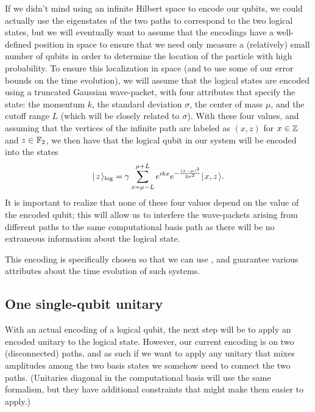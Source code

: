 \documentclass[../thesis-main/thesis-main]{subfiles}
\begin{document}
If we didn't mind using an infinite Hilbert space to encode our qubits, we could actually use the eigenstates of the two paths to correspond to the two logical states, but we will eventually want to assume that the encodings have a well-defined position in space to ensure that we need only measure a (relatively) small number of qubits in order to determine the location of the particle with high probability.  To ensure this localization in space (and to use some of our error bounds on the time evolution), we will assume that the logical states are encoded using a truncated Gaussian wave-packet, with four attributes that specify the state: the momentum $k$, the standard deviation $\sigma$, the center of mass $\mu$, and the cutoff range $L$ (which will be closely related to $\sigma$).  With these four values, and assuming that the vertices of the infinite path are labeled as $(x,z)$ for $x\in \mathbb{Z}$ and $z\in \mathbb{F}_2$, we then have that the logical qubit in our system will be encoded into the states
\begin{align}
  |\mspace{2mu} z \mspace{2mu} \rangle_{\text{log}} = \gamma \sum_{x = \mu - L}^{\mu + L} e^{ i k x} e^{ - \frac{(x-\mu)^2}{2\sigma^2}} |\mspace{2mu} x,z \mspace{2mu} \rangle \label{eq:single_qubit_encoding}.
\end{align}
It is important to realize that none of these four values depend on the value of the encoded qubit; this will allow us to interfere the wave-packets arising from different paths to the same computational basis path as there will be no extraneous information about the logical state.

This encoding is specifically chosen so that we can use , and guarantee various attributes about the time evolution of such systems.


\subsection{One single-qubit unitary}

With an actual encoding of a logical qubit, the next step will be to apply an encoded unitary to the logical state.  However, our current encoding is on two (disconnected) paths, and as such if we want to apply any unitary that mixes amplitudes among the two basis states we somehow need to connect the two paths. (Unitaries diagonal in the computational basis will use the same formalism, but they have additional constraints that might make them easier to apply.)
\end{document}
